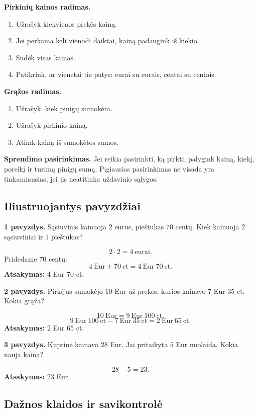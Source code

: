 \textbf{Pirkinių kainos radimas.}
\begin{enumerate}[label=\arabic*.]
\item Užrašyk kiekvienos prekės kainą.
\item Jei perkama keli vienodi daiktai, kainą padaugink iš kiekio.
\item Sudėk visas kainas.
\item Patikrink, ar vienetai tie patys: eurai su eurais, centai su centais.
\end{enumerate}

\textbf{Grąžos radimas.}
\begin{enumerate}[label=\arabic*.]
\item Užrašyk, kiek pinigų sumokėta.
\item Užrašyk pirkinio kainą.
\item Atimk kainą iš sumokėtos sumos.
\end{enumerate}

\textbf{Sprendimo pasirinkimas.}
Jei reikia pasirinkti, ką pirkti, palygink kainą, kiekį, poreikį ir turimą pinigų sumą. Pigiausias pasirinkimas ne visada yra tinkamiausias, jei jis neatitinka uždavinio sąlygos.

\subsection{Iliustruojantys pavyzdžiai}

\textbf{1 pavyzdys.} Sąsiuvinis kainuoja \(2\) eurus, pieštukas \(70\) centų. Kiek kainuoja \(2\) sąsiuviniai ir \(1\) pieštukas?

\[
2\cdot2=4\ \text{eurai}.
\]
Pridedame \(70\) centų:
\[
4\ \text{Eur}+70\ \text{ct}=4\ \text{Eur}\ 70\ \text{ct}.
\]
\textbf{Atsakymas:} \(4\) Eur \(70\) ct.

\textbf{2 pavyzdys.} Pirkėjas sumokėjo \(10\) Eur už prekes, kurios kainavo \(7\) Eur \(35\) ct. Kokia grąža?

\[
10\ \text{Eur}=9\ \text{Eur}\ 100\ \text{ct}.
\]
\[
9\ \text{Eur}\ 100\ \text{ct}-7\ \text{Eur}\ 35\ \text{ct}=2\ \text{Eur}\ 65\ \text{ct}.
\]
\textbf{Atsakymas:} \(2\) Eur \(65\) ct.

\textbf{3 pavyzdys.} Kuprinė kainavo \(28\) Eur. Jai pritaikyta \(5\) Eur nuolaida. Kokia nauja kaina?

\[
28-5=23.
\]
\textbf{Atsakymas:} \(23\) Eur.

\subsection{Dažnos klaidos ir savikontrolė}

